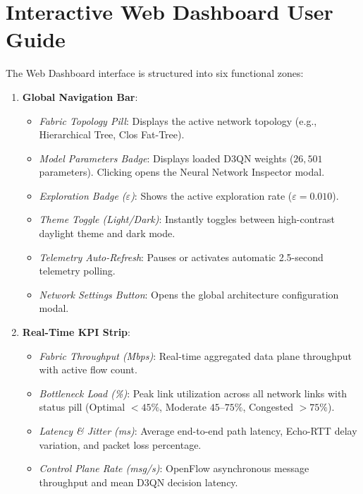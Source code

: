 \documentclass[12pt,a4paper,oneside]{report}
\begin{document}
\section{Interactive Web Dashboard User Guide}
The Web Dashboard interface is structured into six functional zones:
\begin{enumerate}
    \item \textbf{Global Navigation Bar}:
    \begin{itemize}
        \item \textit{Fabric Topology Pill}: Displays the active network topology (e.g., Hierarchical Tree, Clos Fat-Tree).
        \item \textit{Model Parameters Badge}: Displays loaded D3QN weights ($26,501$ parameters). Clicking opens the Neural Network Inspector modal.
        \item \textit{Exploration Badge ($\varepsilon$)}: Shows the active exploration rate ($\varepsilon = 0.010$).
        \item \textit{Theme Toggle (Light/Dark)}: Instantly toggles between high-contrast daylight theme and dark mode.
        \item \textit{Telemetry Auto-Refresh}: Pauses or activates automatic 2.5-second telemetry polling.
        \item \textit{Network Settings Button}: Opens the global architecture configuration modal.
    \end{itemize}
    
    \item \textbf{Real-Time KPI Strip}:
    \begin{itemize}
        \item \textit{Fabric Throughput (Mbps)}: Real-time aggregated data plane throughput with active flow count.
        \item \textit{Bottleneck Load (\%)}: Peak link utilization across all network links with status pill (Optimal $<45\%$, Moderate $45$--$75\%$, Congested $>75\%$).
        \item \textit{Latency \& Jitter (ms)}: Average end-to-end path latency, Echo-RTT delay variation, and packet loss percentage.
        \item \textit{Control Plane Rate (msg/s)}: OpenFlow asynchronous message throughput and mean D3QN decision latency.
    \end{itemize}
    

\end{enumerate}
\end{document}
